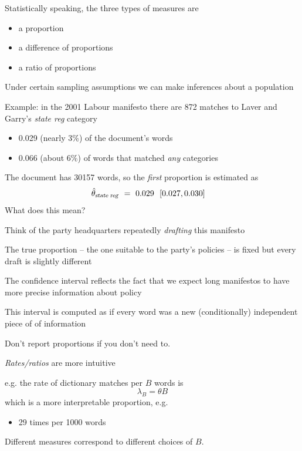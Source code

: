\documentclass[11pt,compress,professionalfonts]{beamer}
\newcommand{\ita}{\begin{itemize}}
\newcommand{\itm}{\item[]}
\newcommand{\itz}{\end{itemize}}
\begin{document}

 Statistically speaking, the three types of measures are
\ita
\itm a proportion
\itm a difference of proportions
\itm a ratio of proportions
\itz
Under certain sampling assumptions we can make inferences about a population

%


Example: in the 2001 Labour manifesto there are 872 matches to Laver and Garry's \textsl{state reg} category
\ita
\itm 0.029 (nearly 3\%) of the document's words
\itm 0.066 (about 6\%) of words that matched \textsl{any} categories
\itz
 The document has 30157 words, so the \textsl{first} proportion is estimated as 
\begin{align*}
\hat{\theta}_\text{\textsl{state reg}} & ~=~ 0.029 ~~[0.027, 0.030]
\end{align*}
What does this mean?  


Think of the party headquarters repeatedly \textsl{drafting} this manifesto

The true proportion -- the one suitable to the party's policies -- is fixed but every draft is slightly different

The confidence interval reflects the fact that we expect long manifestos to have more precise information about policy

This interval is computed as if every word was a new (conditionally) independent piece of of information


Don't report proportions if you don't need to.  

\textsl{Rates/ratios} are more intuitive

e.g. the rate of dictionary matches per $B$ words is
\[
\lambda_B = \theta B
\]
which is a more interpretable proportion, 
e.g. 
\ita
\itm 29 times per 1000 words
\itz
Different measures correspond to different choices of $B$.
\end{document}
